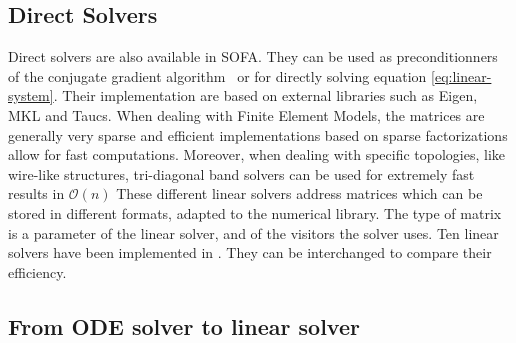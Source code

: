 \subsection{Direct Solvers} Direct solvers are also available in SOFA. They can be used as preconditionners of the conjugate gradient algorithm~\cite{CADC10} or for directly solving equation \ref{eq:linear-system}.
Their implementation are based on external libraries such as Eigen, MKL and Taucs. 
When dealing with Finite Element Models, the matrices are generally very sparse and 
efficient implementations based on sparse factorizations allow for fast computations. 
Moreover, when dealing with specific topologies, like wire-like structures, tri-diagonal band solvers can be used for extremely fast results in $\mathcal{O}(n)$
These different linear solvers address matrices which  can be stored in different formats, adapted to the numerical library.
The type of matrix is a parameter of the linear solver, and of the visitors the solver uses. 
Ten linear solvers have been implemented in \sofa{}. They can be interchanged to compare their efficiency.

\subsection{From ODE solver to linear solver}

